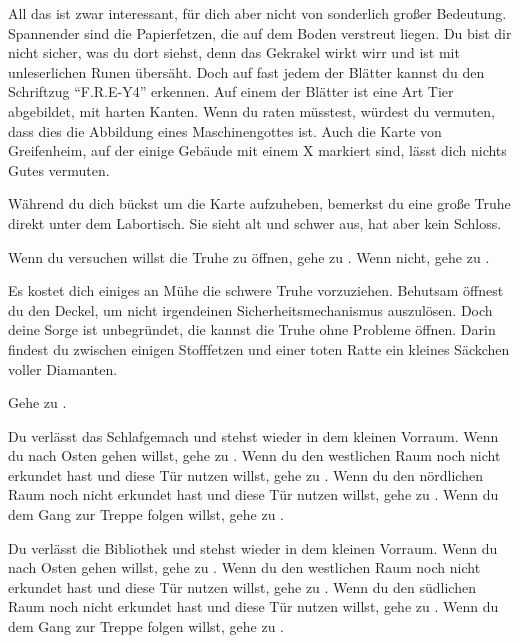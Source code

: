 All das ist zwar interessant, für dich aber nicht von sonderlich großer Bedeutung. Spannender sind die Papierfetzen, die auf dem Boden verstreut liegen. Du bist dir nicht sicher, was du dort siehst, denn das Gekrakel wirkt wirr und ist mit unleserlichen Runen übersäht. Doch auf fast jedem der Blätter kannst du den Schriftzug ``F.R.E-Y4'' erkennen. Auf einem der Blätter ist eine Art Tier abgebildet, mit harten Kanten. Wenn du raten müsstest, würdest du vermuten, dass dies die Abbildung eines Maschinengottes ist. Auch die Karte von Greifenheim, auf der einige Gebäude mit einem X markiert sind, lässt dich nichts Gutes vermuten.

Während du dich bückst um die Karte aufzuheben, bemerkst du eine große Truhe direkt unter dem Labortisch. Sie sieht alt und schwer aus, hat aber kein Schloss.

Wenn du versuchen willst die Truhe zu öffnen, gehe zu . Wenn nicht, gehe zu .


Es kostet dich einiges an Mühe die schwere Truhe vorzuziehen. Behutsam öffnest du den Deckel, um nicht irgendeinen Sicherheitsmechanismus auszulösen. Doch deine Sorge ist unbegründet, die kannst die Truhe ohne Probleme öffnen. Darin findest du zwischen einigen Stofffetzen und einer toten Ratte ein kleines Säckchen  voller Diamanten.

Gehe zu .


Du verlässt das Schlafgemach und stehst wieder in dem kleinen Vorraum. Wenn du nach Osten gehen willst, gehe zu .
Wenn du den westlichen Raum noch nicht erkundet hast und diese Tür nutzen willst, gehe zu .
Wenn du den nördlichen Raum noch nicht erkundet hast und diese Tür nutzen willst, gehe zu .
Wenn du dem Gang zur Treppe folgen willst, gehe zu .


Du verlässt die Bibliothek und stehst wieder in dem kleinen Vorraum. Wenn du nach Osten gehen willst, gehe zu .
Wenn du den westlichen Raum noch nicht erkundet hast und diese Tür nutzen willst, gehe zu .
Wenn du den südlichen Raum noch nicht erkundet hast und diese Tür nutzen willst, gehe zu .
Wenn du dem Gang zur Treppe folgen willst, gehe zu .

